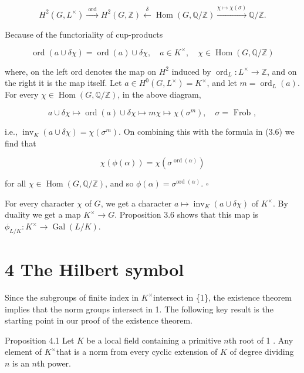 \documentclass[10pt]{article}
\begin{document}
$$
H^{2}\left(G, L^{\times}\right) \xrightarrow{\text { ord }} H^{2}(G, \mathbb{Z}) \stackrel{\delta}{\leftarrow} \operatorname{Hom}(G, \mathbb{Q} / \mathbb{Z}) \xrightarrow{\chi \mapsto \chi(\sigma)} \mathbb{Q} / \mathbb{Z} .
$$

Because of the functoriality of cup-products

$$
\operatorname{ord}(a \cup \delta \chi)=\operatorname{ord}(a) \cup \delta \chi, \quad a \in K^{\times}, \quad \chi \in \operatorname{Hom}(G, \mathbb{Q} / \mathbb{Z})
$$

where, on the left ord denotes the map on $H^{2}$ induced by $\operatorname{ord}_{L}: L^{\times} \rightarrow \mathbb{Z}$, and on the right it is the map itself. Let $a \in H^{0}\left(G, L^{\times}\right)=K^{\times}$, and let $m=\operatorname{ord}_{L}(a)$. For every $\chi \in \operatorname{Hom}(G, \mathbb{Q} / \mathbb{Z})$, in the above diagram,

$$
a \cup \delta \chi \mapsto \operatorname{ord}(a) \cup \delta \chi \mapsto m \chi \mapsto \chi\left(\sigma^{m}\right), \quad \sigma=\text { Frob },
$$

i.e., $\operatorname{inv}_{K}(a \cup \delta \chi)=\chi\left(\sigma^{m}\right)$. On combining this with the formula in (3.6) we find that

$$
\chi(\phi(\alpha))=\chi\left(\sigma^{\operatorname{ord}(\alpha)}\right)
$$

for all $\chi \in \operatorname{Hom}(G, \mathbb{Q} / \mathbb{Z})$, and so $\phi(\alpha)=\sigma^{\text {ord }(\alpha)}$. \(\square\)

For every character $\chi$ of $G$, we get a character $a \mapsto \operatorname{inv}_{K}(a \cup \delta \chi)$ of $K^{\times}$. By duality we get a map $K^{\times} \rightarrow G$. Proposition 3.6 shows that this map is $\phi_{L / K}: K^{\times} \rightarrow \operatorname{Gal}(L / K)$.

\section*{4 The Hilbert symbol}
Since the subgroups of finite index in $K^{\times}$intersect in \{1\}, the existence theorem implies that the norm groups intersect in 1. The following key result is the starting point in our proof of the existence theorem.

Proposition 4.1 Let $K$ be a local field containing a primitive $n$th root of 1 . Any element of $K^{\times}$that is a norm from every cyclic extension of $K$ of degree dividing $n$ is an $n$th power.
\end{document}
